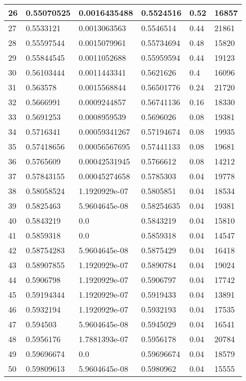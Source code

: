 \begin{longtable}{|l|l|l|l|l|l|}
26 & 0.55070525 & 0.0016435488 & 0.5524516 & 0.52 & 16857 \\ \hline 
27 & 0.5533121 & 0.0013063563 & 0.5546514 & 0.44 & 21861 \\ \hline 
28 & 0.55597544 & 0.0015079961 & 0.55734694 & 0.48 & 15820 \\ \hline 
29 & 0.55844545 & 0.0011052688 & 0.55959594 & 0.44 & 19123 \\ \hline 
30 & 0.56103444 & 0.0011443341 & 0.5621626 & 0.4 & 16096 \\ \hline 
31 & 0.563578 & 0.0015568844 & 0.56501776 & 0.24 & 21720 \\ \hline 
32 & 0.5666991 & 0.0009244857 & 0.56741136 & 0.16 & 18330 \\ \hline 
33 & 0.5691253 & 0.0008959539 & 0.5696026 & 0.08 & 19381 \\ \hline 
34 & 0.5716341 & 0.00059341267 & 0.57194674 & 0.08 & 19935 \\ \hline 
35 & 0.57418656 & 0.00056567695 & 0.57441133 & 0.08 & 19681 \\ \hline 
36 & 0.5765609 & 0.00042531945 & 0.5766612 & 0.08 & 14212 \\ \hline 
37 & 0.57843155 & 0.00045274658 & 0.5785303 & 0.04 & 19778 \\ \hline 
38 & 0.58058524 & 1.1920929e-07 & 0.5805851 & 0.04 & 18534 \\ \hline 
39 & 0.5825463 & 5.9604645e-08 & 0.58254635 & 0.04 & 19381 \\ \hline 
40 & 0.5843219 & 0.0 & 0.5843219 & 0.04 & 15810 \\ \hline 
41 & 0.5859318 & 0.0 & 0.5859318 & 0.04 & 14547 \\ \hline 
42 & 0.58754283 & 5.9604645e-08 & 0.5875429 & 0.04 & 16418 \\ \hline 
43 & 0.58907855 & 1.1920929e-07 & 0.5890784 & 0.04 & 19024 \\ \hline 
44 & 0.5906798 & 1.1920929e-07 & 0.5906797 & 0.04 & 17742 \\ \hline 
45 & 0.59194344 & 1.1920929e-07 & 0.5919433 & 0.04 & 13891 \\ \hline 
46 & 0.5932194 & 1.1920929e-07 & 0.5932193 & 0.04 & 17535 \\ \hline 
47 & 0.594503 & 5.9604645e-08 & 0.5945029 & 0.04 & 16541 \\ \hline 
48 & 0.5956176 & 1.7881393e-07 & 0.5956178 & 0.04 & 20784 \\ \hline 
49 & 0.59696674 & 0.0 & 0.59696674 & 0.04 & 18579 \\ \hline 
50 & 0.59809613 & 5.9604645e-08 & 0.5980962 & 0.04 & 15555 \\ \hline 

\end{longtable}
